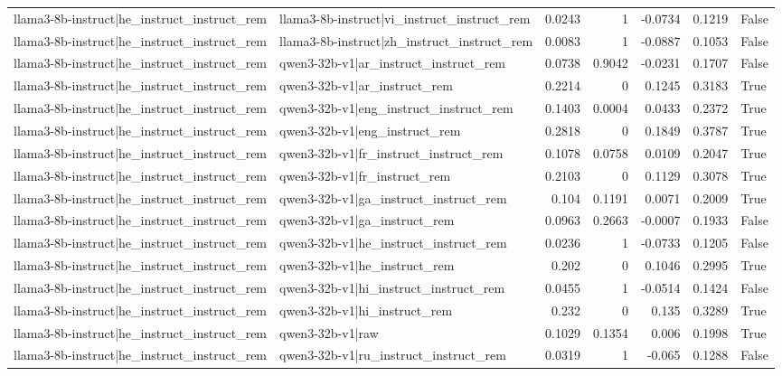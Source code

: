 \begin{table}
\begin{tabular}{l l r r r r l}
llama3-8b-instruct|he_instruct_instruct_rem & llama3-8b-instruct|vi_instruct_instruct_rem & 0.0243 & 1 & -0.0734 & 0.1219 & False \\
llama3-8b-instruct|he_instruct_instruct_rem & llama3-8b-instruct|zh_instruct_instruct_rem & 0.0083 & 1 & -0.0887 & 0.1053 & False \\
llama3-8b-instruct|he_instruct_instruct_rem & qwen3-32b-v1|ar_instruct_instruct_rem & 0.0738 & 0.9042 & -0.0231 & 0.1707 & False \\
llama3-8b-instruct|he_instruct_instruct_rem & qwen3-32b-v1|ar_instruct_rem & 0.2214 & 0 & 0.1245 & 0.3183 & True \\
llama3-8b-instruct|he_instruct_instruct_rem & qwen3-32b-v1|eng_instruct_instruct_rem & 0.1403 & 0.0004 & 0.0433 & 0.2372 & True \\
llama3-8b-instruct|he_instruct_instruct_rem & qwen3-32b-v1|eng_instruct_rem & 0.2818 & 0 & 0.1849 & 0.3787 & True \\
llama3-8b-instruct|he_instruct_instruct_rem & qwen3-32b-v1|fr_instruct_instruct_rem & 0.1078 & 0.0758 & 0.0109 & 0.2047 & True \\
llama3-8b-instruct|he_instruct_instruct_rem & qwen3-32b-v1|fr_instruct_rem & 0.2103 & 0 & 0.1129 & 0.3078 & True \\
llama3-8b-instruct|he_instruct_instruct_rem & qwen3-32b-v1|ga_instruct_instruct_rem & 0.104 & 0.1191 & 0.0071 & 0.2009 & True \\
llama3-8b-instruct|he_instruct_instruct_rem & qwen3-32b-v1|ga_instruct_rem & 0.0963 & 0.2663 & -0.0007 & 0.1933 & False \\
llama3-8b-instruct|he_instruct_instruct_rem & qwen3-32b-v1|he_instruct_instruct_rem & 0.0236 & 1 & -0.0733 & 0.1205 & False \\
llama3-8b-instruct|he_instruct_instruct_rem & qwen3-32b-v1|he_instruct_rem & 0.202 & 0 & 0.1046 & 0.2995 & True \\
llama3-8b-instruct|he_instruct_instruct_rem & qwen3-32b-v1|hi_instruct_instruct_rem & 0.0455 & 1 & -0.0514 & 0.1424 & False \\
llama3-8b-instruct|he_instruct_instruct_rem & qwen3-32b-v1|hi_instruct_rem & 0.232 & 0 & 0.135 & 0.3289 & True \\
llama3-8b-instruct|he_instruct_instruct_rem & qwen3-32b-v1|raw & 0.1029 & 0.1354 & 0.006 & 0.1998 & True \\
llama3-8b-instruct|he_instruct_instruct_rem & qwen3-32b-v1|ru_instruct_instruct_rem & 0.0319 & 1 & -0.065 & 0.1288 & False \\

\end{tabular}
\end{table}
